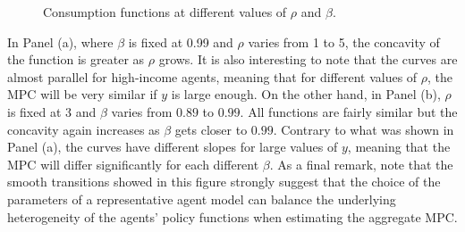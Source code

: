 \documentclass[english, a4paper, 12pt]{article}
\begin{document}
	\begin{figure}[H]
		\caption{Consumption functions at different values of $\rho$ and $\beta$.} \label{fig:ConsRhoBeta}
		
		\hspace{0.045\textwidth}
		\vspace{-1ex}
	\end{figure}

In Panel (a), where $\beta$ is fixed at 0.99 and $\rho$ varies from 1 to 5, the concavity of the function is greater as $\rho$ grows. It is also interesting to note that the curves are almost parallel for high-income agents, meaning that for different values of $\rho$, the MPC will be very similar if $y$ is large enough. On the other hand, in Panel (b), $\rho$ is fixed at 3 and $\beta$ varies from $0.89$ to $0.99$. All functions are fairly similar but the concavity again increases as $\beta$ gets closer to $0.99$. Contrary to what was shown in Panel (a), the curves have different slopes for large values of $y$, meaning that the MPC will differ significantly for each different $\beta$. As a final remark, note that the smooth transitions showed in this figure strongly suggest that the choice of the parameters of a representative agent model can balance the underlying heterogeneity of the agents' policy functions when estimating the aggregate MPC.
	
\end{document}
